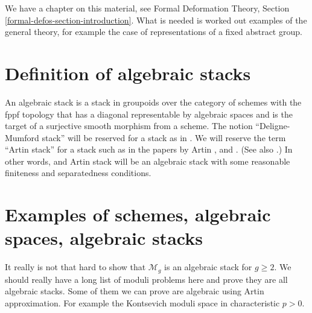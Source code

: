\noindent
We have a chapter on this material, see
Formal Deformation Theory, Section \ref{formal-defos-section-introduction}.
What is needed is worked out examples of the general theory, for example
the case of representations of a fixed abstract group.


\section{Definition of algebraic stacks}
\label{section-definition-algebraic-stacks}

\noindent
An algebraic stack is a stack in groupoids over the category of schemes
with the fppf topology that has a diagonal representable by algebraic
spaces and is the target of a surjective smooth morphism from a scheme.
The notion ``Deligne-Mumford stack'' will be reserved for a stack as in
\cite{DM}. We will reserve the term ``Artin stack'' for
a stack such as in the papers by Artin \cite{ArtinI}, and \cite{ArtinVersal}.
(See also \cite{conrad-dejong}.) In other words, and Artin stack will be an
algebraic stack with some reasonable finiteness and separatedness conditions.


\section{Examples of schemes, algebraic spaces, algebraic stacks}
\label{section-examples-stacks}

\noindent
It really is not that hard to show that $\mathcal{M}_g$ is an algebraic
stack for $g\geq 2$. We should really have a long list of moduli problems
here and prove they are all algebraic stacks. Some of them we can
prove are algebraic using Artin approximation. For example the Kontsevich
moduli space in characteristic $p > 0$.

